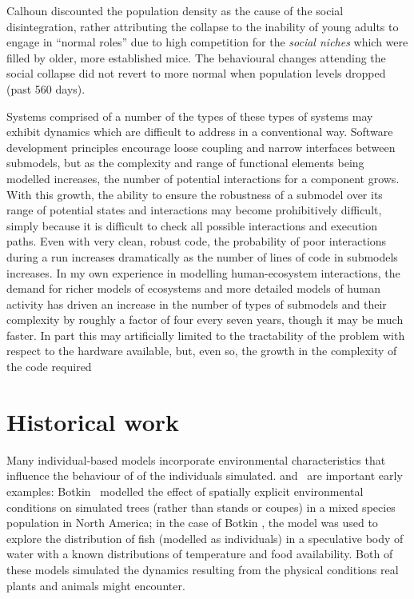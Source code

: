 Calhoun discounted the population density as the cause of the social
disintegration, rather attributing the collapse to the inability of
young adults to engage in ``normal roles'' due to high competition for
the \emph{social niches} which were filled by older, more established
mice. The behavioural changes attending the social collapse did not revert
to more normal when population levels dropped (past 560 days).

Systems comprised of a number of the types of these types of systems
may exhibit dynamics which are difficult to address in a conventional
way. Software development principles encourage loose coupling and
narrow interfaces between submodels, but as the complexity and range
of functional elements being modelled increases, the number of
potential interactions for a component grows.  With this growth, the
ability to ensure the robustness of a submodel over its range of
potential states and interactions may become prohibitively difficult,
simply because it is difficult to check all possible interactions and
execution paths.  Even with very clean, robust code, the probability
of poor interactions during a run increases dramatically as the number
of lines of code in submodels increases. In my own experience in
modelling human-ecosystem interactions, the demand for richer models
of ecosystems and more detailed models of human activity has driven an
increase in the number of types of submodels and their complexity by
roughly a factor of four every seven years, though it may be much
faster.  In part this may artificially limited to the tractability of
the problem with respect to the hardware available, but, even so, the
growth in the complexity of the code required


\section{Historical work}

Many individual-based models incorporate environmental characteristics
that influence the behaviour of of the individuals
simulated.  and~\citet{deangelis1978model} are
important early examples: Botkin \etal\ modelled the effect of
spatially explicit environmental conditions on simulated trees (rather
than stands or coupes) in a mixed species population in
North America; in the case of Botkin \etal, the model was used to
explore the distribution of fish (modelled as individuals) in a
speculative body of water with a known distributions of temperature
and food availability. Both of these models simulated the 
dynamics resulting from the physical conditions real plants and
animals might encounter. 

